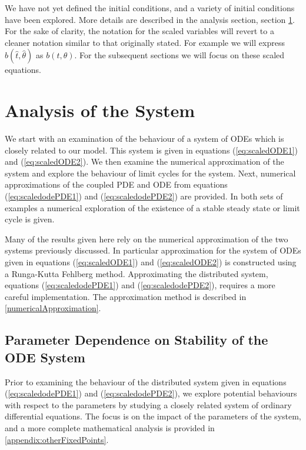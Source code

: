 \documentclass[review,authoryear]{elsarticle}
\newcommand{\scaledB}{\hat{b}}
\newcommand{\scaledTheta}{\hat{\theta}}
\newcommand{\scaledT}{\hat{t}}
\begin{document}
We have not yet defined the initial conditions, and
a variety of initial
conditions have been explored. More details are  described in the analysis
section, section \ref{section:analysis}. For the sake of clarity, the notation for the scaled variables will revert to a cleaner notation similar to that originally stated. For example we will express $\scaledB(\scaledT,\scaledTheta)$ as $b(t,\theta)$. For the subsequent sections we will focus on these scaled equations.

\section{Analysis of the System}
\label{section:analysis}

We start with an
examination of the behaviour of a system of ODEs which is closely related to our model.  This system is given in equations
(\ref{eq:scaledODE1}) and (\ref{eq:scaledODE2}). We then examine the numerical
approximation of the system and explore the behaviour of limit cycles for the system. Next, numerical approximations
of the coupled PDE and ODE from equations (\ref{eq:scaledodePDE1}) and
(\ref{eq:scaledodePDE2}) are provided. In both sets of examples a
numerical exploration of the existence of a stable steady state or
limit cycle is given.

Many of the results given here rely on the numerical approximation of the two
systems previously discussed. In particular approximation for the
system of ODEs given in equations (\ref{eq:scaledODE1}) and
(\ref{eq:scaledODE2}) is constructed using a Runga-Kutta Fehlberg
method. Approximating the distributed system, equations
(\ref{eq:scaledodePDE1}) and (\ref{eq:scaledodePDE2}), requires a more
careful implementation. The approximation method is described in
 \ref{numericalApproximation}.

\subsection{Parameter Dependence on Stability of the ODE System}
\label{subsection:parameters}

Prior to examining the behaviour of the distributed system given in
equations (\ref{eq:scaledodePDE1}) and (\ref{eq:scaledodePDE2}), we explore potential behaviours with respect 
to the parameters by studying  a closely related system of ordinary differential
equations.  The focus is on the impact of the parameters of the
system, and a more complete mathematical analysis is provided in 
\ref{appendix:otherFixedPoints}.
\end{document}
